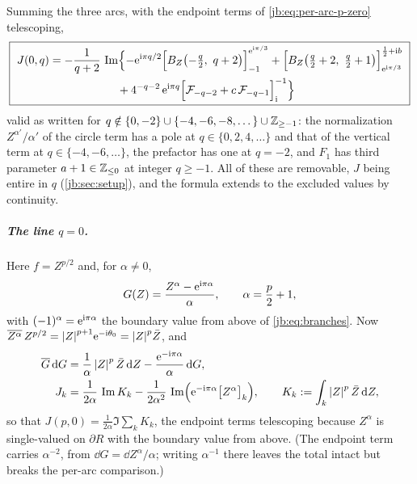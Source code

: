 Summing the three arcs, with the endpoint terms of \eqref{jb:eq:per-arc-p-zero} telescoping,
\begin{equation}
  \label{jb:eq:J-p-zero}
  \boxed{\
  \begin{aligned}
    J(0, q)
      &
      = - \frac{1}{q + 2} \, \operatorname{Im} \Bigl\{
        - \mathrm{e}^{\mathrm{i} \pi q/2} \Bigl[ B_Z \bigl( - \tfrac{q}{2}, \ q + 2 \bigr) \Bigr]_{-1}^{\mathrm{e}^{\mathrm{i} \pi/3}}
        + \Bigl[ B_Z \bigl( \tfrac{q}{2} + 2, \ \tfrac{q}{2} + 1 \bigr) \Bigr]_{\mathrm{e}^{\mathrm{i} \pi/3}}^{\frac12 + \mathrm{i} b}
      \\
      &
      \qquad\qquad\qquad
        + 4^{-q - 2} \, \mathrm{e}^{\mathrm{i} \pi q}
          \Bigl[ {\mathcal{F}}_{-q - 2} + c \, {\mathcal{F}}_{-q - 1} \Bigr]_{\mathrm{i}}^{-1}
      \Bigr\}
  \end{aligned}
  \ }
\end{equation}
valid as written for $q \notin \{ 0, -2 \} \cup \{ -4, -6, -8, \dots \} \cup \mathbb{Z}_{\ge -1}$: the
normalization $Z^{\alpha'} / \alpha'$ of the circle term has a pole at $q \in \{ 0, 2, 4, \dots \}$
and that of the vertical term at $q \in \{ -4, -6, \dots \}$, the prefactor has one at $q = -2$,
and $F_1$ has third parameter $a + 1 \in \mathbb{Z}_{\le 0}$ at integer $q \ge -1$.
All of these are removable, $J$ being entire in $q$ (\cref{jb:sec:setup}), and the formula extends to
the excluded values by continuity.

\subparagraph{The line $q = 0$.}
Here $f = Z^{p/2}$ and, for $\alpha \ne 0$,
\begin{equation}
  \label{jb:eq:G-q-zero}
  G(Z)
    = \frac{Z^{\alpha} - \mathrm{e}^{\mathrm{i} \pi \alpha}}{\alpha},
  \qquad
  \alpha
    = \frac{p}{2} + 1,
\end{equation}
with $(-1)^{\alpha} = \mathrm{e}^{\mathrm{i} \pi \alpha}$ the boundary value from above of \eqref{jb:eq:branches}.
Now $\overline{Z^{\alpha}} \, Z^{p/2} = {|Z|}^{p + 1} \mathrm{e}^{-\mathrm{i} \theta_0} = {|Z|}^{p} \bar Z$, and
\begin{equation}
  \label{jb:eq:reduction-q-zero}
  \begin{aligned}
    \overline{G} \, \mathrm{d} G
      &
      = \frac{1}{\alpha} \, {|Z|}^{p} \, \bar Z \, \mathrm{d} Z
        - \frac{\mathrm{e}^{-\mathrm{i} \pi \alpha}}{\alpha} \, \mathrm{d} G,
    \\
    J_k
      &
      = \frac{1}{2 \alpha} \, \operatorname{Im} K_k
        - \frac{1}{2 \alpha^2} \, \operatorname{Im} \Bigl( \mathrm{e}^{-\mathrm{i} \pi \alpha} \bigl[ Z^{\alpha} \bigr]_k \Bigr),
    \qquad
    K_k
      := \int_k {|Z|}^{p} \, \bar Z \, \mathrm{d} Z,
  \end{aligned}
\end{equation}
so that $J(p, 0) = \tfrac{1}{2 \alpha} \Im \sum_k K_k$, the endpoint terms telescoping because
$Z^{\alpha}$ is single-valued on $\partial R$ with the boundary value from above.
(The endpoint term carries $\alpha^{-2}$, from $\dd G = \dd Z^{\alpha} / \alpha$; writing
$\alpha^{-1}$ there leaves the total intact but breaks the per-arc comparison.)

